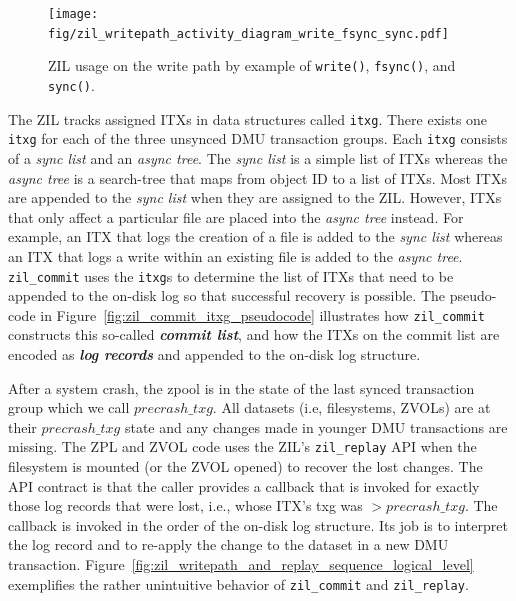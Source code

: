 \documentclass[12pt,a4paper,twoside]{book}
\begin{document}
\begin{figure}[H]
    \centering
    \texttt{[image: fig/zil\_writepath\_activity\_diagram\_write\_fsync\_sync.pdf]}
    \caption{
        ZIL usage on the write path by example of \lstinline{write()}, \lstinline{fsync()}, and \lstinline{sync()}.
    }
    \label{fig:zil_api_syscall_activity_diagrams}
\end{figure}

The ZIL tracks assigned ITXs in data structures called \lstinline{itxg}.
There exists one \lstinline{itxg} for each of the three unsynced DMU transaction groups.
Each \lstinline{itxg} consists of a \textit{sync list} and an \textit{async tree}.
The \textit{sync list} is a simple list of ITXs whereas the \textit{async tree} is a search-tree that maps from object ID to a list of ITXs.
Most ITXs are appended to the \textit{sync list} when they are assigned to the ZIL.
However, ITXs that only affect a particular file are placed into the \textit{async tree} instead.
For example, an ITX that logs the creation of a file is added to the \textit{sync list} whereas an ITX that logs a write within an existing file is added to the \textit{async tree}.
\lstinline{zil_commit} uses the \lstinline{itxg}s to determine the list of ITXs that need to be appended to the on-disk log so that successful recovery is possible.
The pseudo-code in Figure~\ref{fig:zil_commit_itxg_pseudocode} illustrates how \lstinline{zil_commit} constructs this so-called \textit{\textbf{commit list}}, and how the ITXs on the commit list are encoded as \textit{\textbf{log records}} and appended to the on-disk log structure.

After a system crash, the zpool is in the state of the last synced transaction group which we call $precrash\_txg$.
All datasets (i.e, filesystems, ZVOLs) are at their $precrash\_txg$ state and any changes made in younger DMU transactions are missing.
The ZPL and ZVOL code uses the ZIL's \lstinline{zil_replay} API when the filesystem is mounted (or the ZVOL opened) to recover the lost changes.
The API contract is that the caller provides a callback that is invoked for exactly those log records that were lost, i.e., whose ITX's txg was $> precrash\_txg$.
The callback is invoked in the order of the on-disk log structure.
Its job is to interpret the log record and to re-apply the change to the dataset in a new DMU transaction.
Figure~\ref{fig:zil_writepath_and_replay_sequence_logical_level} exemplifies the rather unintuitive behavior of \lstinline{zil_commit} and \lstinline{zil_replay}.
\end{document}
